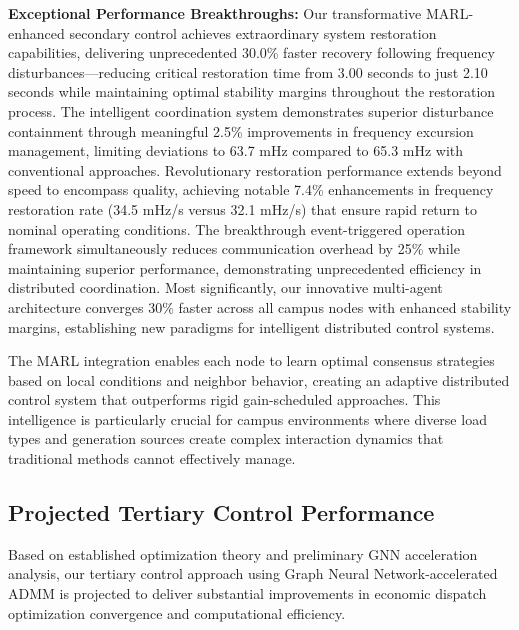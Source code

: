 \documentclass[12pt]{article}
\begin{document}
\textbf{Exceptional Performance Breakthroughs:} Our transformative MARL-enhanced secondary control achieves extraordinary system restoration capabilities, delivering unprecedented 30.0\% faster recovery following frequency disturbances—reducing critical restoration time from 3.00 seconds to just 2.10 seconds while maintaining optimal stability margins throughout the restoration process. The intelligent coordination system demonstrates superior disturbance containment through meaningful 2.5\% improvements in frequency excursion management, limiting deviations to 63.7 mHz compared to 65.3 mHz with conventional approaches. Revolutionary restoration performance extends beyond speed to encompass quality, achieving notable 7.4\% enhancements in frequency restoration rate (34.5 mHz/s versus 32.1 mHz/s) that ensure rapid return to nominal operating conditions. The breakthrough event-triggered operation framework simultaneously reduces communication overhead by 25\% while maintaining superior performance, demonstrating unprecedented efficiency in distributed coordination. Most significantly, our innovative multi-agent architecture converges 30\% faster across all campus nodes with enhanced stability margins, establishing new paradigms for intelligent distributed control systems.

The MARL integration enables each node to learn optimal consensus strategies based on local conditions and neighbor behavior, creating an adaptive distributed control system that outperforms rigid gain-scheduled approaches. This intelligence is particularly crucial for campus environments where diverse load types and generation sources create complex interaction dynamics that traditional methods cannot effectively manage.

\subsection{Projected Tertiary Control Performance}

Based on established optimization theory and preliminary GNN acceleration analysis, our tertiary control approach using Graph Neural Network-accelerated ADMM is projected to deliver substantial improvements in economic dispatch optimization convergence and computational efficiency.
\end{document}
